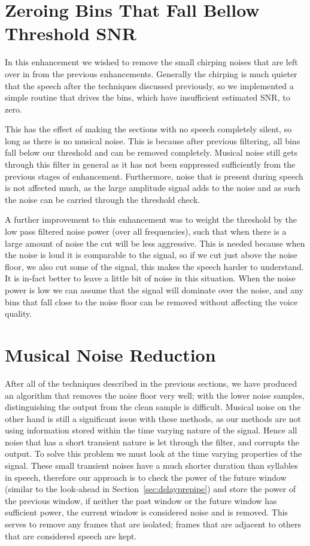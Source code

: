 \documentclass[11pt]{article} %
\begin{document}
{\section{Zeroing Bins That Fall Bellow Threshold SNR} 

In this enhancement we wished to remove the small chirping noises that are left over in from the previous enhancements. Generally the chirping is much quieter that the speech after the techniques discussed previously, so we implemented a simple routine that drives the bins, which have insufficient estimated SNR, to zero.

This has the effect of making the sections with no speech completely silent, so long as there is no musical noise. This is because after previous filtering, all bins fall below our threshold and can be removed completely. Musical noise still gets through this filter in general as it has not been suppressed sufficiently from the previous stages of enhancement. Furthermore, noise that is present during speech is not affected much, as the large amplitude signal adds to the noise and as such the noise can be carried through the threshold check. 

A further improvement to this enhancement was to weight the threshold by the low pass filtered noise power (over all frequencies), such that when there is a large amount of noise the cut will be less aggressive. This is needed because when the noise is loud it is comparable to the signal, so if we cut just above the noise floor, we also cut some of the signal, this makes the speech harder to understand. It is in-fact better to leave a little bit of noise in this situation. When the noise power is low we can assume that the signal will dominate over the noise, and any bins that fall close to the noise floor can be removed without affecting the voice quality.  

\section{Musical Noise Reduction} 
\label{sec:musicalNoise}
After all of the techniques described in the previous sections, we have produced an algorithm that removes the noise floor very well; with the lower noise samples, distinguishing the output from the clean sample is difficult. Musical noise on the other hand is still a significant issue with these methods, as our methods are not using information stored within the time varying nature of the signal. Hence all noise that has a short transient nature is let through the filter, and corrupts the output. To solve this problem we must look at the time varying properties of the signal. These small transient noises have a much shorter duration than syllables in speech, therefore our approach is to check the power of the future window (similar to the look-ahead in Section~\ref{sec:delayprepipe}) and store the power of the previous window, if neither the past window or the future window has sufficient power, the current window is considered noise and is removed. This serves to remove any frames that are isolated; frames that are adjacent to others that are considered speech are kept. 

}
\end{document}
